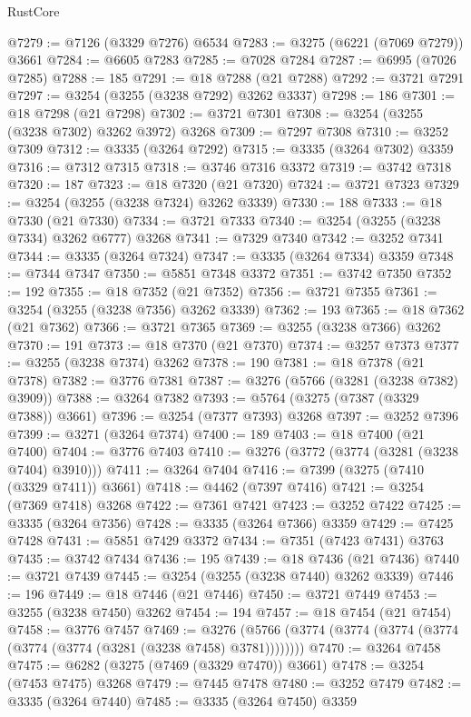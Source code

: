 \begin{lexlean}{RustCore}
\begin{coremodule}
@7279 := @7126 (@3329 @7276) @6534
@7283 := @3275 (@6221 (@7069 @7279)) @3661
@7284 := @6605 @7283
@7285 := @7028 @7284
@7287 := @6995 (@7026 @7285)
@7288 := 185
@7291 := @18 @7288 (@21 @7288)
@7292 := @3721 @7291
@7297 := @3254 (@3255 (@3238 @7292) @3262 @3337)
@7298 := 186
@7301 := @18 @7298 (@21 @7298)
@7302 := @3721 @7301
@7308 := @3254 (@3255 (@3238 @7302) @3262 @3972) @3268
@7309 := @7297 @7308
@7310 := @3252 @7309
@7312 := @3335 (@3264 @7292)
@7315 := @3335 (@3264 @7302) @3359
@7316 := @7312 @7315
@7318 := @3746 @7316 @3372
@7319 := @3742 @7318
@7320 := 187
@7323 := @18 @7320 (@21 @7320)
@7324 := @3721 @7323
@7329 := @3254 (@3255 (@3238 @7324) @3262 @3339)
@7330 := 188
@7333 := @18 @7330 (@21 @7330)
@7334 := @3721 @7333
@7340 := @3254 (@3255 (@3238 @7334) @3262 @6777) @3268
@7341 := @7329 @7340
@7342 := @3252 @7341
@7344 := @3335 (@3264 @7324)
@7347 := @3335 (@3264 @7334) @3359
@7348 := @7344 @7347
@7350 := @5851 @7348 @3372
@7351 := @3742 @7350
@7352 := 192
@7355 := @18 @7352 (@21 @7352)
@7356 := @3721 @7355
@7361 := @3254 (@3255 (@3238 @7356) @3262 @3339)
@7362 := 193
@7365 := @18 @7362 (@21 @7362)
@7366 := @3721 @7365
@7369 := @3255 (@3238 @7366) @3262
@7370 := 191
@7373 := @18 @7370 (@21 @7370)
@7374 := @3257 @7373
@7377 := @3255 (@3238 @7374) @3262
@7378 := 190
@7381 := @18 @7378 (@21 @7378)
@7382 := @3776 @7381
@7387 := @3276 (@5766 (@3281 (@3238 @7382) @3909))
@7388 := @3264 @7382
@7393 := @5764 (@3275 (@7387 (@3329 @7388)) @3661)
@7396 := @3254 (@7377 @7393) @3268
@7397 := @3252 @7396
@7399 := @3271 (@3264 @7374)
@7400 := 189
@7403 := @18 @7400 (@21 @7400)
@7404 := @3776 @7403
@7410 := @3276 (@3772 (@3774 (@3281 (@3238 @7404) @3910)))
@7411 := @3264 @7404
@7416 := @7399 (@3275 (@7410 (@3329 @7411)) @3661)
@7418 := @4462 (@7397 @7416)
@7421 := @3254 (@7369 @7418) @3268
@7422 := @7361 @7421
@7423 := @3252 @7422
@7425 := @3335 (@3264 @7356)
@7428 := @3335 (@3264 @7366) @3359
@7429 := @7425 @7428
@7431 := @5851 @7429 @3372
@7434 := @7351 (@7423 @7431) @3763
@7435 := @3742 @7434
@7436 := 195
@7439 := @18 @7436 (@21 @7436)
@7440 := @3721 @7439
@7445 := @3254 (@3255 (@3238 @7440) @3262 @3339)
@7446 := 196
@7449 := @18 @7446 (@21 @7446)
@7450 := @3721 @7449
@7453 := @3255 (@3238 @7450) @3262
@7454 := 194
@7457 := @18 @7454 (@21 @7454)
@7458 := @3776 @7457
@7469 := @3276 (@5766 (@3774 (@3774 (@3774 (@3774 (@3774 (@3774 (@3281 (@3238 @7458) @3781))))))))
@7470 := @3264 @7458
@7475 := @6282 (@3275 (@7469 (@3329 @7470)) @3661)
@7478 := @3254 (@7453 @7475) @3268
@7479 := @7445 @7478
@7480 := @3252 @7479
@7482 := @3335 (@3264 @7440)
@7485 := @3335 (@3264 @7450) @3359

\end{coremodule}
\end{lexlean}

